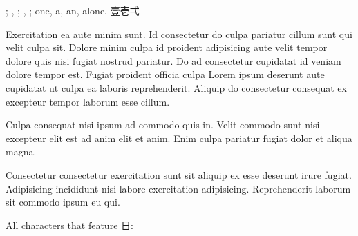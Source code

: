 


{};
{},
{};
{},
{};
one, a, an, alone. {\cjk{}壹壱弌}



\vspace{\mktsLineheight}\begin{multicols}{2}\raggedcolumns{}
Exercitation ea aute minim sunt. Id consectetur do culpa pariatur cillum sunt qui velit culpa sit. Dolore minim culpa id proident adipisicing aute velit tempor dolore quis nisi fugiat nostrud pariatur. Do ad consectetur cupidatat id veniam dolore tempor est. Fugiat proident officia culpa Lorem ipsum deserunt aute cupidatat ut culpa ea laboris reprehenderit. Aliquip do consectetur consequat ex excepteur tempor laborum esse cillum.


Culpa consequat nisi ipsum ad commodo quis in. Velit commodo sunt nisi excepteur elit est ad anim elit et anim. Enim culpa pariatur fugiat dolor et aliqua magna.


Consectetur consectetur exercitation sunt sit aliquip ex esse deserunt irure fugiat. Adipisicing incididunt nisi labore exercitation adipisicing. Reprehenderit laborum sit commodo ipsum eu qui.



\end{multicols}


{\mktsHTwo{}All characters that feature {\cjk{}日}:\mktsHTwoBeg}%


